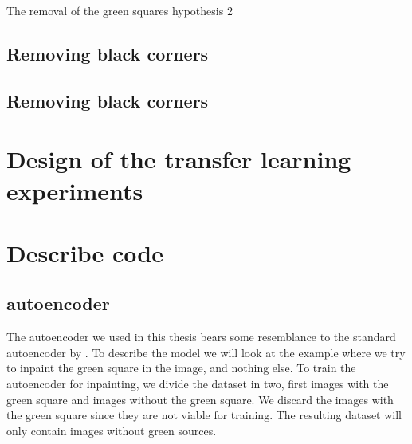 The removal of the green squares  hypothesis 2




\subsection{Removing black corners}
\subsection{Removing black corners}

\section{Design of the transfer learning experiments}

 
\section{Describe code}
\subsection{autoencoder}
The autoencoder we used in this thesis bears some resemblance to the standard autoencoder by . 
To describe the model we will look at the example where we try to inpaint the green square in the image, and nothing else.
To train the autoencoder for inpainting, we divide the dataset in two, first images with the green square and images without the green square. We discard the images with the green square since they are not viable for training. 
The resulting dataset will only contain images without green sources.

